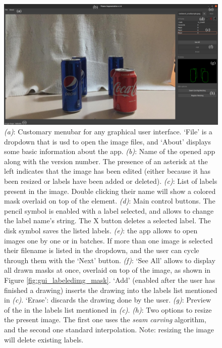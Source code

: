 \documentclass[../main.tex]{subfiles}
\begin{document}
\begin{figure}[H]
    \centering
    \includegraphics[width=1\linewidth]{images/gui_labeledimg_annotations.png}
    \caption{\emph{(a)}: Customary menubar for any graphical user interface. `File' is a dropdown that is usd to open the image files, and `About' displays some basic information about the app. \emph{(b)}: Name of the opened app along with the version number. The presence of an asterisk at the left indicates that the image has been edited (either because it has been resized or labels have been added or deleted). \emph{(c)}: List of labels present in the image. Double clicking their name will show a colored mask overlaid on top of the element. \emph{(d)}: Main control buttons. The pencil symbol is enabled with a label selected, and allows to change the label name's string. The X button deletes a selected label. The disk symbol saves the listed labels. \emph{(e)}: the app allows to open images one by one or in batches. If more than one image is selected their filename is listed in the dropdown, and the user can cycle through them with the `Next' button. \emph{(f)}: `See All' allows to display all drawn masks at once, overlaid on top of the image, as shown in Figure \ref{fig:gui_labeledimg_mask}. `Add' (enabled after the user has finished a drawing) inserts the drawing into the labels list mentioned in \emph{(c)}. `Erase': discards the drawing done by the user. \emph{(g)}: Preview of the in the labels list mentioned in \emph{(c)}. \emph{(h)}: Two options to resize the present image. The first one uses the \emph{seam carving} algorithm, and the second one standard interpolation. Note: resizing the image will delete existing labels.}
    \label{fig:gui_labeledimg_annotations}
\end{figure}
\end{document}
